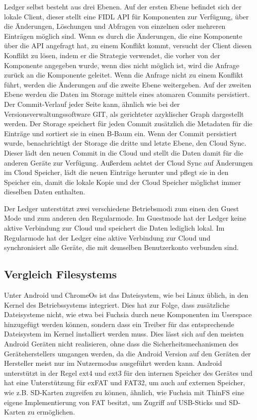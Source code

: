 \documentclass[a4paper]{scrartcl}
\begin{document}
Ledger selbst besteht aus drei Ebenen. Auf der ersten Ebene befindet sich der lokale Client, dieser stellt eine FIDL API für Komponenten zur Verfügung, über die Änderungen, Löschungen und Abfragen von einzelnen oder mehreren Einträgen möglich sind. Wenn es durch die Änderungen, die eine Komponente über die API angefragt hat, zu einem Konflikt kommt, versucht der Client diesen Konflikt zu lösen, indem er die Strategie verwendet, die vorher von der Komponente angegeben wurde, wenn dies nicht möglich ist, wird die Anfrage zurück an die Komponente geleitet. Wenn die Anfrage nicht zu einem Konflikt führt, werden die Änderungen auf die zweite Ebene weitergeben. Auf der zweiten Ebene werden die Daten im Storage mittels eines atomaren Commits persistiert. Der Commit-Verlauf jeder Seite kann, ähnlich wie bei der Versionsverwaltungssoftware GIT, als gerichteter azyklischer Graph dargestellt werden. Der Storage speichert für jeden Commit zusätzlich die Metadaten für die Einträge und sortiert sie in einen B-Baum ein. Wenn der Commit persistiert wurde, benachrichtigt der Storage die dritte und letzte Ebene, den Cloud Sync. Dieser lädt den neuen Commit in die Cloud und stellt die Daten damit für die anderen Geräte zur Verfügung. Außerdem achtet der Cloud Sync auf Änderungen im Cloud Speicher, lädt die neuen Einträge herunter und pflegt sie in den Speicher ein, damit die lokale Kopie und der Cloud Speicher möglichst immer dieselben Daten enthalten. \cite{Fuchsia.Ledger}

Der Ledger unterstützt zwei verschiedene Betriebsmodi zum einen den Guest Mode und zum anderen den Regularmode. Im Guestmode hat der Ledger keine aktive Verbindung zur Cloud und speichert die Daten lediglich lokal. Im Regularmode hat der Ledger eine aktive Verbindung zur Cloud und synchronisiert alle Geräte, die mit demselben Benutzerkonto verbunden sind.
\subsection{Vergleich Filesystems}
\label{sec:vglFileSystems}
Unter Android und ChromeOs ist das Dateisystem, wie bei Linux üblich, in den Kernel des Betriebssystems integriert. Dies hat zur Folge, dass zusätzliche Dateisysteme nicht, wie etwa bei Fuchsia durch neue Komponenten im Userspace hinzugefügt werden können, sondern dass ein Treiber für das entsprechende Dateisystem im Kernel installiert werden muss. Dies lässt sich auf den meisten Android Geräten nicht realisieren, ohne dass die Sicherheitsmechanismen des Geräteherstellers umgangen werden, da die Android Version auf den Geräten der Hersteller meist nur im Nutzermodus ausgeführt werden kann. Android unterstützt in der Regel ext4 und ext3 für den internen Speicher des Gerätes und hat eine Unterstützung für exFAT und FAT32, um auch auf externen Speicher, wie z.B. SD-Karten zugreifen zu können, ähnlich, wie Fuchsia mit ThinFS eine eigene Implementierung von FAT besitzt, um Zugriff auf USB-Sticks und SD-Karten zu ermöglichen.
\end{document}
